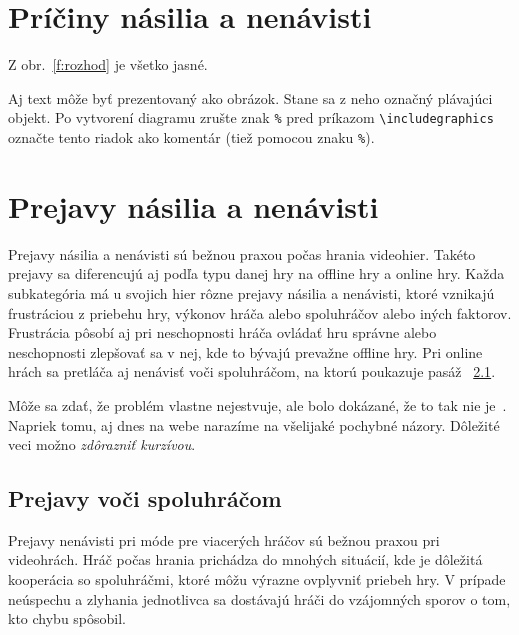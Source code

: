 \documentclass[10pt,twoside,slovak,a4paper]{article}
\begin{document}



\section{Príčiny násilia a nenávisti} \label{priciny}


Z obr.~\ref{f:rozhod} je všetko jasné. 

\begin{figure*}[tbh]
\centering
Aj text môže byť prezentovaný ako obrázok. Stane sa z neho označný plávajúci objekt. Po vytvorení diagramu zrušte znak \texttt{\%} pred príkazom \verb|\includegraphics| označte tento riadok ako komentár (tiež pomocou znaku \texttt{\%}).
\caption{Rozhodujúci argument.}
\label{f:rozhod}
\end{figure*}



\section{Prejavy násilia a nenávisti} \label{prejavy}

Prejavy násilia a nenávisti sú bežnou praxou počas hrania videohier. Takéto prejavy sa diferencujú aj podľa typu danej hry na offline hry a online hry. Každa subkategória má u svojich hier rôzne prejavy násilia a nenávisti, ktoré vznikajú frustráciou z priebehu hry, výkonov hráča alebo spoluhráčov alebo iných faktorov. Frustrácia pôsobí aj pri neschopnosti hráča ovládať hru správne alebo neschopnosti zlepšovať sa v nej\cite{UoR-Failure}, kde to bývajú prevažne offline hry. Pri online hrách sa pretláča aj nenávisť voči spoluhráčom, na ktorú poukazuje pasáž ~\ref{ina:spoluhraci}.

Môže sa zdať, že problém vlastne nejestvuje\cite{Coplien:MPD}, ale bolo dokázané, že to tak nie je~\cite{Czarnecki:Staged, Czarnecki:Progress}. Napriek tomu, aj dnes na webe narazíme na všelijaké pochybné názory\cite{PLP-Framework}. Dôležité veci možno \emph{zdôrazniť kurzívou}.


\subsection{Prejavy voči spoluhráčom} \label{ina:spoluhraci}
Prejavy nenávisti pri móde pre viacerých hráčov sú bežnou praxou pri videohrách. Hráč počas hrania prichádza do mnohých situácií, kde je dôležitá kooperácia so spoluhráčmi, ktoré môžu výrazne ovplyvniť priebeh hry. V prípade neúspechu a zlyhania jednotlivca sa dostávajú hráči do vzájomných sporov o tom, kto chybu spôsobil. 
\end{document}
